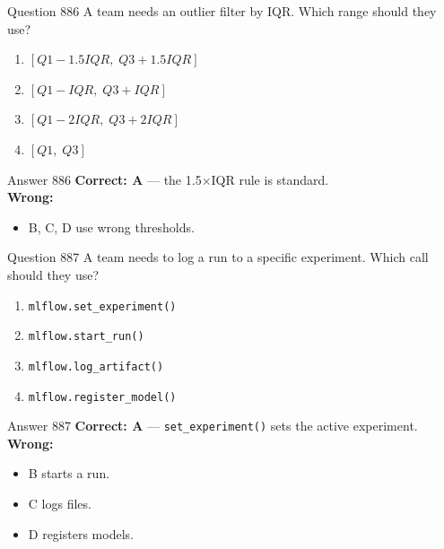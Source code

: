 \documentclass[aspectratio=169,11pt]{beamer}
\begin{document}
	\begin{frame}{Question 886}
		A team needs an outlier filter by IQR. Which range should they use?
		\begin{enumerate}[label=\Alph*.]
			\item $[Q1-1.5IQR,\; Q3+1.5IQR]$
			\item $[Q1-IQR,\; Q3+IQR]$
			\item $[Q1-2IQR,\; Q3+2IQR]$
			\item $[Q1,\; Q3]$
		\end{enumerate}
	\end{frame}
	\begin{frame}{Answer 886}
		\textbf{Correct: A} --- the 1.5$\times$IQR rule is standard.\\
		\vspace{0.5em}
		\textbf{Wrong:}
		\begin{itemize}
			\item B, C, D use wrong thresholds.
		\end{itemize}
	\end{frame}
	
	\begin{frame}{Question 887}
		A team needs to log a run to a specific experiment. Which call should they use?
		\begin{enumerate}[label=\Alph*.]
			\item \texttt{mlflow.set\_experiment()}
			\item \texttt{mlflow.start\_run()}
			\item \texttt{mlflow.log\_artifact()}
			\item \texttt{mlflow.register\_model()}
		\end{enumerate}
	\end{frame}
	\begin{frame}{Answer 887}
		\textbf{Correct: A} --- \texttt{set\_experiment()} sets the active experiment.\\
		\vspace{0.5em}
		\textbf{Wrong:}
		\begin{itemize}
			\item B starts a run.
			\item C logs files.
			\item D registers models.
		\end{itemize}
	\end{frame}
	
\end{document}
